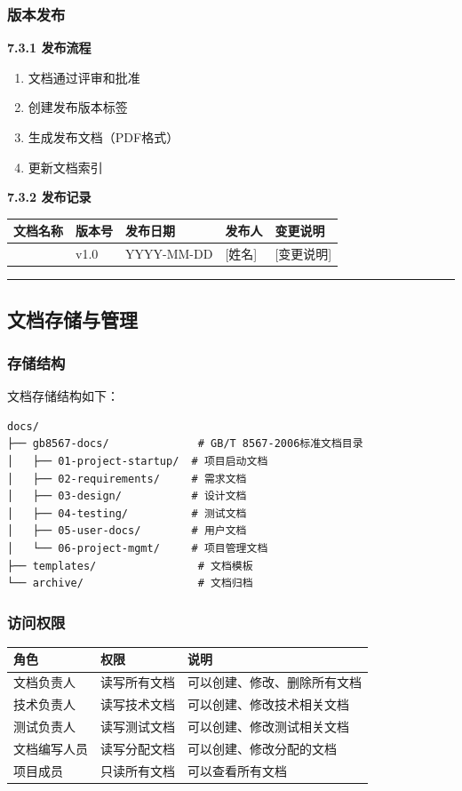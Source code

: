 \documentclass[12pt,a4paper]{article}
\numberwithin{equation}{section}  %
\begin{document}
\subsubsection{版本发布}
\textbf{7.3.1 发布流程}
\begin{enumerate}
\item 文档通过评审和批准
\item 创建发布版本标签
\item 生成发布文档（PDF格式）
\item 更新文档索引
\end{enumerate}

\textbf{7.3.2 发布记录}

\begin{longtable}{|p{2.5cm}|p{3cm}|p{3cm}|p{3cm}|p{2.5cm}|}
\hline
文档名称 & 版本号 & 发布日期 & 发布人 & 变更说明 \\
\hline
[文档名称] & v1.0 & YYYY-MM-DD & [姓名] & [变更说明] \\
\hline
\end{longtable}

\hrule
\subsection{文档存储与管理}
\subsubsection{存储结构}
文档存储结构如下：

\begin{verbatim}
docs/
├── gb8567-docs/              # GB/T 8567-2006标准文档目录
│   ├── 01-project-startup/  # 项目启动文档
│   ├── 02-requirements/     # 需求文档
│   ├── 03-design/           # 设计文档
│   ├── 04-testing/          # 测试文档
│   ├── 05-user-docs/        # 用户文档
│   └── 06-project-mgmt/     # 项目管理文档
├── templates/                # 文档模板
└── archive/                  # 文档归档
\end{verbatim}

\subsubsection{访问权限}
\begin{longtable}{|p{4cm}|p{5cm}|p{5cm}|}
\hline
角色 & 权限 & 说明 \\
\hline
文档负责人 & 读写所有文档 & 可以创建、修改、删除所有文档 \\
技术负责人 & 读写技术文档 & 可以创建、修改技术相关文档 \\
测试负责人 & 读写测试文档 & 可以创建、修改测试相关文档 \\
文档编写人员 & 读写分配文档 & 可以创建、修改分配的文档 \\
项目成员 & 只读所有文档 & 可以查看所有文档 \\
\hline
\end{longtable}
\end{document}
